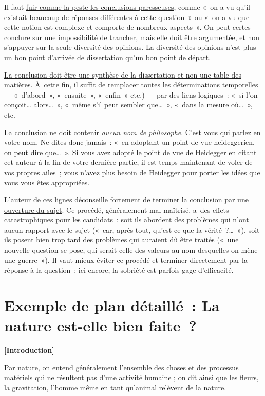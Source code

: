 \documentclass[a4paper,12pt]{article}
\begin{document}
Il faut \uline{fuir comme la peste les conclusions paresseuses}, comme « on a
vu qu'il existait beaucoup de réponses différentes à cette question » ou
« on a vu que cette notion est complexe et comporte de nombreux
aspects ». On peut certes conclure sur une impossibilité de trancher,
mais elle doit être argumentée, et non s'appuyer sur la seule diversité
des opinions. La diversité des opinions n'est plus un bon point
d'arrivée de dissertation qu'un bon point de départ.

\uline{La conclusion doit être une synthèse de la dissertation et non une
table des matières}. À cette fin, il suffit de remplacer toutes les
déterminations temporelles --- « d'abord », « ensuite », « enfin » etc.)
--- par des liens logiques : « si l'on conçoit\ldots{} alors\ldots{} », « même
s'il peut sembler que\ldots{} », « dans la mesure où\ldots{} », etc.

\uline{La conclusion ne doit contenir \emph{aucun nom de philosophe}}. C'est vous
qui parlez en votre nom. Ne dites donc jamais : « en adoptant un point
de vue heideggerien, on peut dire que\ldots{} ». Si vous avez adopté le point
de vue de Heidegger en citant cet auteur à la fin de votre dernière
partie, il est temps maintenant de voler de vos propres ailes ; vous
n'avez plus besoin de Heidegger pour porter les idées que vous vous êtes
appropriées.

\uline{L'auteur de ces lignes déconseille fortement de terminer la conclusion
par une ouverture du sujet}. Ce procédé, généralement mal maîtrisé,
a des effets catastrophiques pour les candidats : soit ils abordent des
problèmes qui n'ont aucun rapport avec le sujet (« car, après tout,
qu'est-ce que la vérité ?\ldots{} »), soit ils posent bien trop tard des
problèmes qui auraient dû être traités (« une nouvelle question se pose,
qui serait celle des valeurs au nom desquelles on mène une guerre »). Il
vaut mieux éviter ce procédé et terminer directement par la réponse à la
question : ici encore, la sobriété est parfois gage d'efficacité.

\section{Exemple de plan détaillé : La nature est-elle bien faite ?}
\label{sec:org4ef4d45}
\label{orgd0bb5c5}

\textbf{[Introduction]}

Par nature, on entend généralement l'ensemble des
choses et des processus matériels qui ne résultent pas d'une activité
humaine ; on dit ainsi que les fleurs, la gravitation, l'homme même en
tant qu'animal relèvent de la nature.
\end{document}
